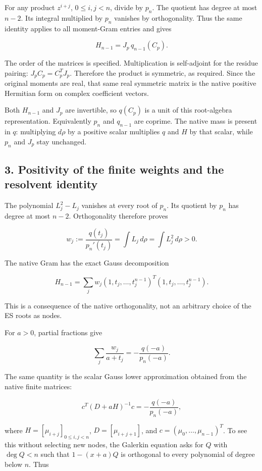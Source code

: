 For any product \(z^{i+j}\), \(0\le i,j<n\), divide by \(p_n\). The
quotient has degree at most \(n-2\). Its integral multiplied by \(p_n\)
vanishes by orthogonality. Thus the same identity applies to all
moment-Gram entries and gives

\[
 \boxed{H_{n-1}=J_p\,q_{n-1}(C_p).}
\]

The order of the matrices is specified. Multiplication is self-adjoint
for the residue pairing: \(J_pC_p=C_p^TJ_p\). Therefore the product is
symmetric, as required. Since the original moments are real, that same
real symmetric matrix is the native positive Hermitian form on complex
coefficient vectors.

Both \(H_{n-1}\) and \(J_p\) are invertible, so \(q(C_p)\) is a unit of
this root-algebra representation. Equivalently \(p_n\) and \(q_{n-1}\)
are coprime. The native mass is present in \(q\): multiplying \(d\rho\)
by a positive scalar multiplies \(q\) and \(H\) by that scalar, while
\(p_n\) and \(J_p\) stay unchanged.

\subsection{3. Positivity of the finite weights and the resolvent
identity}\label{positivity-of-the-finite-weights-and-the-resolvent-identity}

The polynomial \(L_j^2-L_j\) vanishes at every root of \(p_n\). Its
quotient by \(p_n\) has degree at most \(n-2\). Orthogonality therefore
proves

\[
 w_j:=\frac{q(t_j)}{p_n'(t_j)}
 =\int L_j\,d\rho=\int L_j^2\,d\rho>0.
\]

The native Gram has the exact Gauss decomposition

\[
 H_{n-1}=\sum_j w_j(1,t_j,\ldots,t_j^{n-1})^T
                    (1,t_j,\ldots,t_j^{n-1}).
\]

This is a consequence of the native orthogonality, not an arbitrary
choice of the ES roots as nodes.

For \(a>0\), partial fractions give

\[
 \sum_j\frac{w_j}{a+t_j}=-\frac{q(-a)}{p_n(-a)}.
\]

The same quantity is the scalar Gauss lower approximation obtained from
the native finite matrices:

\[
 c^T(D+aH)^{-1}c=-\frac{q(-a)}{p_n(-a)},
\]

where \(H=[\mu_{i+j}]_{0\le i,j<n}\), \(D=[\mu_{i+j+1}]\), and
\(c=(\mu_0,\ldots,\mu_{n-1})^T\). To see this without selecting new
nodes, the Galerkin equation asks for \(Q\) with \(\deg Q<n\) such that
\(1-(x+a)Q\) is orthogonal to every polynomial of degree below \(n\).
Thus

